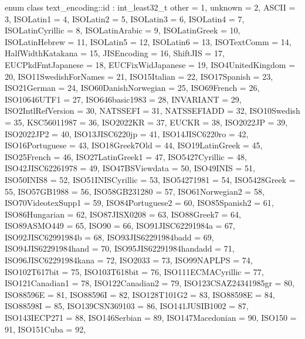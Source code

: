 \documentclass{wg21}
\begin{document}
\begin{addedblock}
\begin{codeblock}
    enum class text_encoding::id : int_least32_t {
        other = 1,
        unknown = 2,
        ASCII = 3,
        ISOLatin1 = 4,
        ISOLatin2 = 5,
        ISOLatin3 = 6,
        ISOLatin4 = 7,
        ISOLatinCyrillic = 8,
        ISOLatinArabic = 9,
        ISOLatinGreek = 10,
        ISOLatinHebrew = 11,
        ISOLatin5 = 12,
        ISOLatin6 = 13,
        ISOTextComm = 14,
        HalfWidthKatakana = 15,
        JISEncoding = 16,
        ShiftJIS = 17,
        EUCPkdFmtJapanese = 18,
        EUCFixWidJapanese = 19,
        ISO4UnitedKingdom = 20,
        ISO11SwedishForNames = 21,
        ISO15Italian = 22,
        ISO17Spanish = 23,
        ISO21German = 24,
        ISO60DanishNorwegian = 25,
        ISO69French = 26,
        ISO10646UTF1 = 27,
        ISO646basic1983 = 28,
        INVARIANT = 29,
        ISO2IntlRefVersion = 30,
        NATSSEFI = 31,
        NATSSEFIADD = 32,
        ISO10Swedish = 35,
        KSC56011987 = 36,
        ISO2022KR = 37,
        EUCKR = 38,
        ISO2022JP = 39,
        ISO2022JP2 = 40,
        ISO13JISC6220jp = 41,
        ISO14JISC6220ro = 42,
        ISO16Portuguese = 43,
        ISO18Greek7Old = 44,
        ISO19LatinGreek = 45,
        ISO25French = 46,
        ISO27LatinGreek1 = 47,
        ISO5427Cyrillic = 48,
        ISO42JISC62261978 = 49,
        ISO47BSViewdata = 50,
        ISO49INIS = 51,
        ISO50INIS8 = 52,
        ISO51INISCyrillic = 53,
        ISO54271981 = 54,
        ISO5428Greek = 55,
        ISO57GB1988 = 56,
        ISO58GB231280 = 57,
        ISO61Norwegian2 = 58,
        ISO70VideotexSupp1 = 59,
        ISO84Portuguese2 = 60,
        ISO85Spanish2 = 61,
        ISO86Hungarian = 62,
        ISO87JISX0208 = 63,
        ISO88Greek7 = 64,
        ISO89ASMO449 = 65,
        ISO90 = 66,
        ISO91JISC62291984a = 67,
        ISO92JISC62991984b = 68,
        ISO93JIS62291984badd = 69,
        ISO94JIS62291984hand = 70,
        ISO95JIS62291984handadd = 71,
        ISO96JISC62291984kana = 72,
        ISO2033 = 73,
        ISO99NAPLPS = 74,
        ISO102T617bit = 75,
        ISO103T618bit = 76,
        ISO111ECMACyrillic = 77,
        ISO121Canadian1 = 78,
        ISO122Canadian2 = 79,
        ISO123CSAZ24341985gr = 80,
        ISO88596E = 81,
        ISO88596I = 82,
        ISO128T101G2 = 83,
        ISO88598E = 84,
        ISO88598I = 85,
        ISO139CSN369103 = 86,
        ISO141JUSIB1002 = 87,
        ISO143IECP271 = 88,
        ISO146Serbian = 89,
        ISO147Macedonian = 90,
        ISO150 = 91,
        ISO151Cuba = 92,
}
\end{codeblock}
\end{addedblock}
\end{document}
